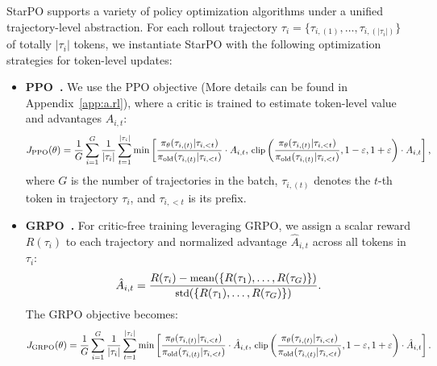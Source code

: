 StarPO supports a variety of policy optimization algorithms under a unified trajectory-level abstraction. For each rollout trajectory $\tau_i = \{\tau_{i,(1)}, \ldots, \tau_{i,(|\tau_i|)}\}$ of totally $|\tau_i|$ tokens, we instantiate StarPO with the following optimization strategies for token-level updates:
\vspace{-5pt}
\begin{itemize}[left=2pt, itemsep=2pt, topsep=4pt]
    \item \textbf{PPO~\citep{schulman2017proximalpolicyoptimizationalgorithms}.} We use the PPO objective (More details can be found in Appendix~\ref{app:a.rl}), where a critic is trained to estimate token-level value and advantages $A_{i,t}$:
    \begin{equation}
    \small
        J_{\text{PPO}}(\theta) = \frac{1}{G} \sum_{i=1}^G \frac{1}{|\tau_i|} \sum_{t=1}^{|\tau_i|}
        \min \left[
            \frac{\pi_\theta(\tau_{i,(t)}|\tau_{i,<t})}{\pi_{\text{old}}(\tau_{i,(t)}|\tau_{i,<t})} \cdot A_{i,t},\,
            \text{clip}\left( \frac{\pi_\theta(\tau_{i,(t)}|\tau_{i,<t})}{\pi_{\text{old}}(\tau_{i,(t)}|\tau_{i,<t})}, 1 - \epsilon, 1 + \epsilon \right) \cdot A_{i,t}
        \right],
    \end{equation}
    where $G$ is the number of trajectories in the batch, $\tau_{i,(t)}$ denotes the $t$-th token in trajectory $\tau_i$, and $\tau_{i,<t}$ is its prefix.

    \item \textbf{GRPO~\citep{shao2024deepseekmathpushinglimitsmathematical}.} For critic-free training leveraging GRPO, we assign a scalar reward $R(\tau_i)$ to each trajectory and normalized advantage $\hat{A}_{i,t}$ across all tokens in $\tau_i$:
    \begin{equation}
    \small
        \hat{A}_{i,t} = \frac{R(\tau_i) - \text{mean}(\{R(\tau_1), \ldots, R(\tau_G)\})}
                             {\text{std}(\{R(\tau_1), \ldots, R(\tau_G)\})}.
    \end{equation}
    The GRPO objective becomes:
    \begin{equation}
        \small
        J_{\text{GRPO}}(\theta) = \frac{1}{G} \sum_{i=1}^G \frac{1}{|\tau_i|} \sum_{t=1}^{|\tau_i|} 
        \min \left[
            \frac{\pi_\theta(\tau_{i,(t)}|\tau_{i,<t})}{\pi_{\text{old}}(\tau_{i,(t)}|\tau_{i,<t})} \cdot \hat{A}_{i,t},\,
            \text{clip}\left( \frac{\pi_\theta(\tau_{i,(t)}|\tau_{i,<t})}{\pi_{\text{old}}(\tau_{i,(t)}|\tau_{i,<t})}, 1 - \epsilon, 1 + \epsilon \right) \cdot \hat{A}_{i,t}
        \right].
    \end{equation}
\end{itemize}



